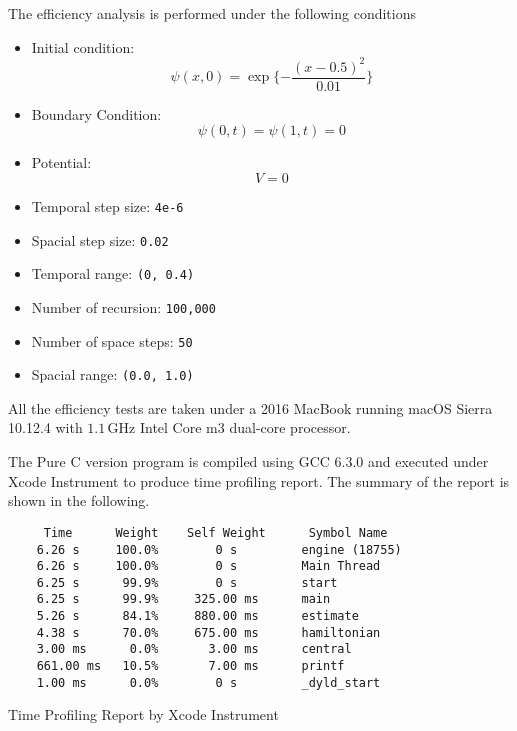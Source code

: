 \documentclass[11pt]{article}
\begin{document}
The efficiency analysis is performed under the following conditions
\begin{itemize}
  \setlength\itemsep{-3pt}
  \item Initial condition:
    \begin{equation}
      \psi(x,0) = \exp\{-\frac{(x - 0.5)^2}{0.01}\}
    \end{equation}
  \item Boundary Condition:
  	\begin{equation}
      \psi(0,t) = \psi(1,t) = 0
    \end{equation}
  \item Potential:
    \begin{equation}
      V = 0
    \end{equation}
\end{itemize}
\begin{multicols}{2}
\begin{itemize}
  \setlength\itemsep{-3pt}
  \item Temporal step size: \lstinline{4e-6}
  \item Spacial step size: \lstinline{0.02}
  \item Temporal range: \lstinline{(0, 0.4)}
  \item Number of recursion: \lstinline{100,000}
  \item Number of space steps: \lstinline{50}
  \item Spacial range: \lstinline{(0.0, 1.0)}
\end{itemize}
\end{multicols}

All the efficiency tests are taken under a 2016 MacBook running macOS Sierra 10.12.4 with $1.1\,\mathrm{GHz}$ Intel Core m3 dual-core processor.


The Pure C version program is compiled using GCC 6.3.0 and executed under Xcode Instrument to produce time profiling report. The summary of the report is shown in the following.

\begin{table}[H]
\setlength\abovecaptionskip{0pt}
\begin{lstlisting}
	 Time      Weight    Self Weight      Symbol Name
	6.26 s     100.0%        0 s         engine (18755)
	6.26 s     100.0%        0 s         Main Thread
	6.25 s      99.9%        0 s         start
	6.25 s      99.9%     325.00 ms      main
	5.26 s      84.1%     880.00 ms      estimate
	4.38 s      70.0%     675.00 ms      hamiltonian
	3.00 ms      0.0%       3.00 ms      central
	661.00 ms   10.5%       7.00 ms      printf
	1.00 ms      0.0%        0 s         _dyld_start
\end{lstlisting}
\caption{Time Profiling Report by Xcode Instrument}
\end{table}
\end{document}
